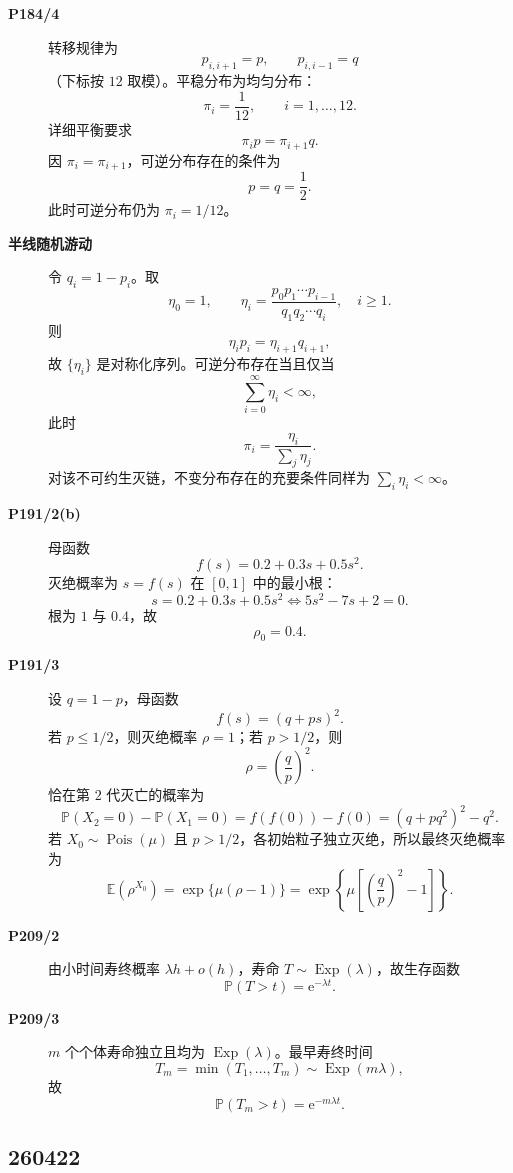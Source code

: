 \documentclass[12pt,a4paper,openany]{ctexrep}
\theoremstyle{definition}
\newcommand{\E}{\mathbb{E}}
\newcommand{\Pp}{\mathbb{P}}
\newcommand{\Pois}{\operatorname{Pois}}
\newcommand{\Exp}{\operatorname{Exp}}
\newcommand{\e}{\mathrm{e}}
\begin{document}
\begin{description}
	\item[\textbf{P184/4}]
	转移规律为
	\[
	p_{i,i+1}=p,\qquad p_{i,i-1}=q
	\]
	（下标按 $12$ 取模）。平稳分布为均匀分布：
	\[
	\pi_i=\frac1{12},\qquad i=1,\dots,12.
	\]
	详细平衡要求
	\[
	\pi_i p=\pi_{i+1}q.
	\]
	因 $\pi_i=\pi_{i+1}$，可逆分布存在的条件为
	\[
	p=q=\frac12.
	\]
	此时可逆分布仍为 $\pi_i=1/12$。
	\item[\textbf{半线随机游动}]
	令 $q_i=1-p_i$。取
	\[
	\eta_0=1,\qquad
	\eta_i=\frac{p_0p_1\cdots p_{i-1}}{q_1q_2\cdots q_i},\quad i\ge1.
	\]
	则
	\[
	\eta_i p_i=\eta_{i+1}q_{i+1},
	\]
	故 $\{\eta_i\}$ 是对称化序列。可逆分布存在当且仅当
	\[
	\sum_{i=0}^{\infty}\eta_i<\infty,
	\]
	此时
	\[
	\pi_i=\frac{\eta_i}{\sum_j\eta_j}.
	\]
	对该不可约生灭链，不变分布存在的充要条件同样为 $\sum_i\eta_i<\infty$。
	\item[\textbf{P191/2(b)}]
	母函数
	\[
	f(s)=0.2+0.3s+0.5s^2.
	\]
	灭绝概率为 $s=f(s)$ 在 $[0,1]$ 中的最小根：
	\[
	s=0.2+0.3s+0.5s^2
	\Longleftrightarrow
	5s^2-7s+2=0.
	\]
	根为 $1$ 与 $0.4$，故
	\[
	\rho_0=0.4.
	\]
	\item[\textbf{P191/3}]
	设 $q=1-p$，母函数
	\[
	f(s)=(q+ps)^2.
	\]
	若 $p\le1/2$，则灭绝概率 $\rho=1$；若 $p>1/2$，则
	\[
	\rho=\left(\frac{q}{p}\right)^2.
	\]
	恰在第 $2$ 代灭亡的概率为
	\[
	\Pp(X_2=0)-\Pp(X_1=0)
	=f(f(0))-f(0)
	=(q+pq^2)^2-q^2.
	\]
	若 $X_0\sim\Pois(\mu)$ 且 $p>1/2$，各初始粒子独立灭绝，所以最终灭绝概率为
	\[
	\E(\rho^{X_0})=\exp\{\mu(\rho-1)\}
	=
	\exp\left\{\mu\left[\left(\frac{q}{p}\right)^2-1\right]\right\}.
	\]
	\item[\textbf{P209/2}]
	由小时间寿终概率 $\lambda h+o(h)$，寿命 $T\sim\Exp(\lambda)$，故生存函数
	\[
	\Pp(T>t)=\e^{-\lambda t}.
	\]
	\item[\textbf{P209/3}]
	$m$ 个个体寿命独立且均为 $\Exp(\lambda)$。最早寿终时间
	\[
	T_m=\min(T_1,\dots,T_m)\sim\Exp(m\lambda),
	\]
	故
	\[
	\Pp(T_m>t)=\e^{-m\lambda t}.
	\]
\end{description}

\subsection*{260422}
\end{document}
